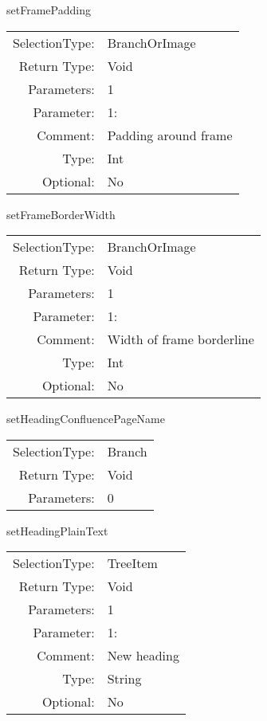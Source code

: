 \item setFramePadding\\
\begin{tabular}{rl}
  SelectionType: & BranchOrImage\\
    Return Type: & Void\\
     Parameters: & 1\\
   Parameter: &  1:\\
        Comment: & Padding around frame\\
           Type: & Int\\
       Optional: &  No\\
\end{tabular}

\item setFrameBorderWidth\\
\begin{tabular}{rl}
  SelectionType: & BranchOrImage\\
    Return Type: & Void\\
     Parameters: & 1\\
   Parameter: &  1:\\
        Comment: & Width of frame borderline\\
           Type: & Int\\
       Optional: &  No\\
\end{tabular}

\item setHeadingConfluencePageName\\
\begin{tabular}{rl}
  SelectionType: & Branch\\
    Return Type: & Void\\
     Parameters: & 0\\
\end{tabular}

\item setHeadingPlainText\\
\begin{tabular}{rl}
  SelectionType: & TreeItem\\
    Return Type: & Void\\
     Parameters: & 1\\
   Parameter: &  1:\\
        Comment: & New heading\\
           Type: & String\\
       Optional: &  No\\
\end{tabular}

